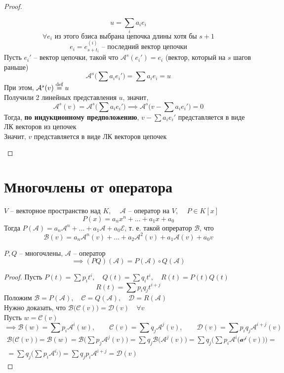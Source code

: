 \begin{proof}
\begin{itemize}
		$$ u = \sum_i a_ie_i $$
		$$ \forall e_i \text{ из этого бзиса выбрана цепочка длины хотя бы } s + 1 $$
		$$ e_i = e_{s + t_i}^{(i)} \text{ -- последний вектор цепочки} $$
		Пусть $ e_i' $ -- вектор цепочки, такой что $ \mathcal{A}^s(e_i') = e_i $ (вектор, который на $ s $ шагов раньше)
		$$ \mathcal{A}^s \bigg( \sum a_ie_i' \bigg) = \sum a_ie_i = u $$
		При этом, $ \mathcal{A}^s(v) \stackrel{\text{def}}{=} u $ \\
		Получили 2 линейных представления $ u $, значит,
		$$ \mathcal{A}^s(v) = \mathcal{A}^s \bigg( \sum a_ie_i' \bigg) \implies \mathcal{A}^s \bigg( v - \sum a_ie_i' \bigg) = 0 $$
		Тогда, \textbf{по индукционному предположению}, $ v - \sum a_ie_i' $ представляется в виде ЛК векторов из цепочек \\
		Значит, $ v $ представляется в виде ЛК векторов цепочек
	\end{itemize}
\end{proof}

\section{Многочлены от оператора}

\begin{notation}
	$ V $ -- векторное пространство над $ K $, $ \quad \mathcal{A} $ -- оператор на $ V $, $ \quad P \in K[x] $
	$$ P(x) = a_nx^n + ... + a_1x + a_0 $$
	Тогда $ P(\mathcal{A}) = a_n\mathcal{A}^n + ... + a_1\mathcal{A} + a_0\mathcal{E} $, т. е. такой опрератор $ \mathcal{B} $, что
	$$ \mathcal{B}(v) = a_n \mathcal{A}^n(v) + ... + a_2\mathcal{A}^2(v) + a_1\mathcal{A}(v) + a_0v $$
\end{notation}

\begin{lemma}
	$ P, Q $ -- многочлены, $ \mathcal{A} $ -- оператор
	$$ \implies (PQ)(\mathcal{A}) = P(\mathcal{A}) \circ Q(\mathcal{A}) $$
\end{lemma}

\begin{proof}
	Пусть $ P(t) = \sum p_it^i, \quad Q(t) = \sum q_it^i, \quad R(t) = P(t)Q(t) $
	$$ R(t) = \sum p_iq_jt^{i + j} $$
	Положим $ \mathcal{B} = P(\mathcal{A}), \quad \mathcal{C} = Q(\mathcal{A}), \quad \mathcal{D} = R(\mathcal{A}) $ \\
	Нужно доказать, что $ \mathcal{B} \bigg( \mathcal{C}(v) \bigg) = \mathcal{D}(v) \quad \forall v $ \\
	Пусть $ w = \mathcal{C}(v) $
	$$ \implies \mathcal{B}(w) = \sum p_i \mathcal{A}^i(w), \qquad \mathcal{C}(v) = \sum q_j\mathcal{A}^j(v), \qquad \mathcal{D}(v) = \sum p_iq_j \mathcal{A}^{i + j}(v) $$
	\begin{multline*}
		\mathcal{B} \bigg( \mathcal{C}(v) \bigg) = \mathcal{B}(w) = \mathcal{B} \bigg( \sum p_j \mathcal{A}^j(v) \bigg) = \sum q_j \mathcal{B} \bigg( \mathcal{A}^j(v) \bigg) = \sum q_j \bigg( \sum p_i \mathcal{A}^i \big( \mathcal{a^j}(v) \big) \bigg) = \\
		= \sum q_j \bigg( \sum p_i \mathcal{A}^{i _ j} \bigg) = \sum q_jp_i \mathcal{A}^{i + j} = \mathcal{D}(v)
	\end{multline*}
\end{proof}

